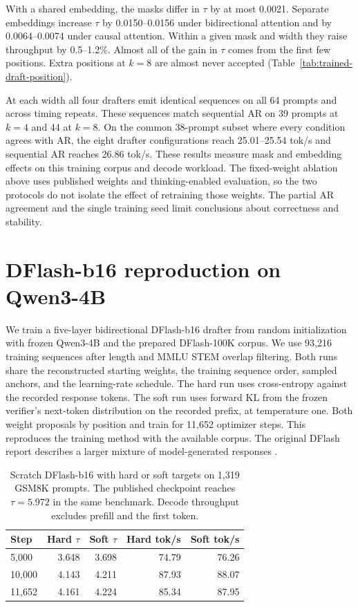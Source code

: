 With a shared embedding, the masks differ in $\tau$ by at most 0.0021.
Separate embeddings increase $\tau$ by 0.0150--0.0156 under bidirectional
attention and by 0.0064--0.0074 under causal attention. Within a given mask
and width they raise throughput by 0.5--1.2\%. Almost all of the gain in
$\tau$ comes from the first few positions. Extra positions at $k=8$ are
almost never accepted (Table~\ref{tab:trained-draft-position}).

At each width all four drafters emit identical sequences on all 64 prompts
and across timing repeats. These sequences match sequential AR on 39
prompts at $k=4$ and 44 at $k=8$. On the common 38-prompt subset where every
condition agrees with AR, the eight drafter configurations reach
25.01--25.54 tok/s and sequential AR reaches 26.86 tok/s. These results
measure mask and embedding effects on this training corpus and decode
workload. The fixed-weight ablation above uses published weights and
thinking-enabled evaluation, so the two protocols do not isolate the
effect of retraining those weights. The partial AR agreement and the
single training seed limit conclusions about correctness and stability.

\section{DFlash-b16 reproduction on Qwen3-4B}\label{app:dflash-reproduction}
We train a five-layer bidirectional DFlash-b16 drafter from random
initialization with frozen Qwen3-4B and the prepared DFlash-100K corpus.
We use 93,216 training sequences after length and MMLU STEM overlap
filtering. Both runs share the reconstructed starting weights, the
training sequence order, sampled anchors, and the learning-rate schedule.
The hard run uses cross-entropy against the recorded response tokens.
The soft run uses forward KL from the frozen verifier's next-token
distribution on the recorded prefix, at temperature one.
Both weight proposals by position and train for 11,652 optimizer steps.
This reproduces the training method with the available corpus. The
original DFlash report describes a larger mixture of model-generated
responses \citep{chen2026dflash}.

\begin{table}[t]
\centering
\small
\setlength{\tabcolsep}{3pt}
\begin{tabular}{lrrrr}
\toprule
Step & Hard $\tau$ & Soft $\tau$ & Hard tok/s & Soft tok/s \\
\midrule
5,000 & 3.648 & 3.698 & 74.79 & 76.26 \\
10,000 & 4.143 & 4.211 & 87.93 & 88.07 \\
11,652 & 4.161 & 4.224 & 85.34 & 87.95 \\
\bottomrule
\end{tabular}
\caption{Scratch DFlash-b16 with hard or soft targets on 1,319 GSM8K
prompts. The published checkpoint reaches $\tau=5.972$ in the same
benchmark. Decode throughput excludes prefill and the first token.}
\label{tab:dflash-reproduction}
\end{table}

